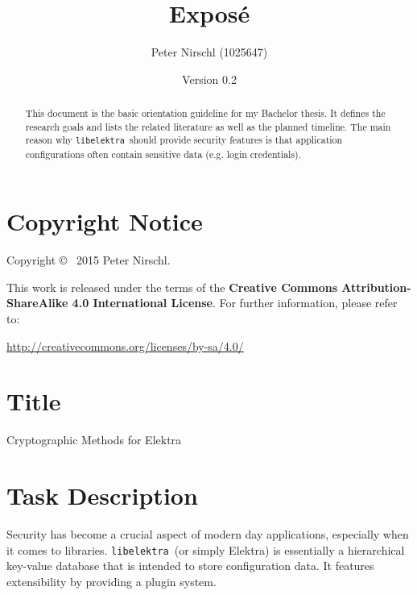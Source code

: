 \documentclass[a4paper,12pt]{article}
\title{Exposé}
\author{Peter Nirschl (1025647)}
\date{Version 0.2}
\newcommand{\libelektra}{\texttt{libelektra}~}
\begin{document}
\maketitle
\begin{abstract}
This document is the basic orientation guideline for my Bachelor thesis.
It defines the research goals and lists the related literature as well as the planned timeline.
The main reason why \libelektra should provide security features is that application configurations often contain sensitive data (e.g. login credentials).
\end{abstract}

\vfill

\section*{Copyright Notice}

Copyright \copyright~ 2015 Peter Nirschl.

This work is released under the terms of the \textbf{Creative Commons Attribution-ShareAlike 4.0 International License}.
For further information, please refer to:

\url{http://creativecommons.org/licenses/by-sa/4.0/}

\newpage

\section{Title}

Cryptographic Methods for Elektra


\section{Task Description}

Security has become a crucial aspect of modern day applications, especially when it comes to libraries.
\libelektra (or simply Elektra) is essentially a hierarchical key-value database that is intended to store configuration data.
It features extensibility by providing a plugin system.
\end{document}
